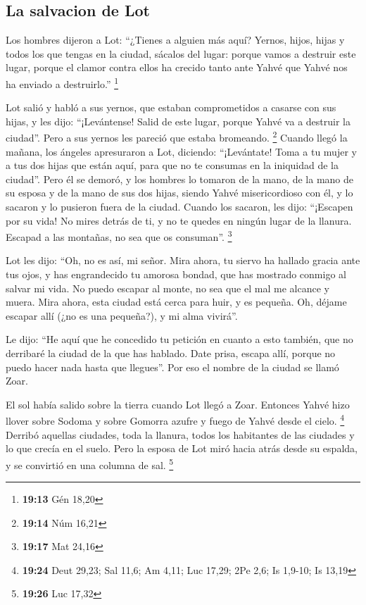 \begin{paracol}{2}
\hypertarget{la-salvacion-de-lot}{%
\subsection{La salvacion de Lot}\label{la-salvacion-de-lot}}

 Los hombres dijeron a Lot: ``¿Tienes a alguien más aquí?
Yernos, hijos, hijas y todos los que tengas en la ciudad, sácalos del
lugar:  porque vamos a destruir este lugar, porque el
clamor contra ellos ha crecido tanto ante Yahvé que Yahvé nos ha enviado
a destruirlo.'' \footnote{\textbf{19:13} Gén 18,20}

 Lot salió y habló a sus yernos, que estaban
comprometidos a casarse con sus hijas, y les dijo: ``¡Levántense! Salid
de este lugar, porque Yahvé va a destruir la ciudad''. Pero a sus yernos
les pareció que estaba bromeando. \footnote{\textbf{19:14} Núm 16,21}
 Cuando llegó la mañana, los ángeles apresuraron a Lot,
diciendo: ``¡Levántate! Toma a tu mujer y a tus dos hijas que están
aquí, para que no te consumas en la iniquidad de la ciudad''.
 Pero él se demoró, y los hombres lo tomaron de la mano,
de la mano de su esposa y de la mano de sus dos hijas, siendo Yahvé
misericordioso con él, y lo sacaron y lo pusieron fuera de la ciudad.
 Cuando los sacaron, les dijo: ``¡Escapen por su vida! No
mires detrás de ti, y no te quedes en ningún lugar de la llanura.
Escapad a las montañas, no sea que os consuman''. \footnote{\textbf{19:17}
  Mat 24,16}

 Lot les dijo: ``Oh, no es así, mi señor. 
Mira ahora, tu siervo ha hallado gracia ante tus ojos, y has
engrandecido tu amorosa bondad, que has mostrado conmigo al salvar mi
vida. No puedo escapar al monte, no sea que el mal me alcance y muera.
 Mira ahora, esta ciudad está cerca para huir, y es
pequeña. Oh, déjame escapar allí (¿no es una pequeña?), y mi alma
vivirá''.

 Le dijo: ``He aquí que he concedido tu petición en
cuanto a esto también, que no derribaré la ciudad de la que has hablado.
 Date prisa, escapa allí, porque no puedo hacer nada
hasta que llegues''. Por eso el nombre de la ciudad se llamó Zoar.

 El sol había salido sobre la tierra cuando Lot llegó a
Zoar.  Entonces Yahvé hizo llover sobre Sodoma y sobre
Gomorra azufre y fuego de Yahvé desde el cielo. \footnote{\textbf{19:24}
  Deut 29,23; Sal 11,6; Am 4,11; Luc 17,29; 2Pe 2,6; Is 1,9-10; Is 13,19}
 Derribó aquellas ciudades, toda la llanura, todos los
habitantes de las ciudades y lo que crecía en el suelo. 
Pero la esposa de Lot miró hacia atrás desde su espalda, y se convirtió
en una columna de sal. \footnote{\textbf{19:26} Luc 17,32}


\end{paracol}

